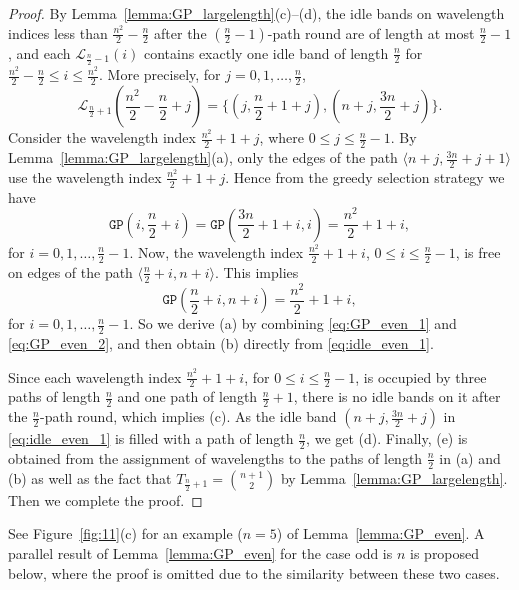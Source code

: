 \documentclass[journal,draftcls,onecolumn,12pt,twoside]{IEEEtran}
\newcommand{\GP}{{\mathtt{GP}}}
\begin{document}
\begin{proof}
By Lemma~\ref{lemma:GP_largelength}(c)--(d), the idle bands on wavelength indices less than $\frac{n^2}{2}-\frac{n}{2}$ after the $(\frac{n}{2}-1)$-path round are of length at most $\frac{n}{2}-1$, and each $\mathcal{L}_{\frac{n}{2}-1}(i)$ contains exactly one idle band of length $\frac{n}{2}$ for $\frac{n^2}{2}-\frac{n}{2}\leq i\leq \frac{n^2}{2}$.
More precisely, for $j=0,1,\ldots,\frac{n}{2}$,
\begin{equation}\label{eq:idle_even_1}
\mathcal{L}_{\frac{n}{2}+1}(\frac{n^2}{2}-\frac{n}{2}+j)=\Big\{(j,\frac{n}{2}+1+j),(n+j,\frac{3n}{2}+j)\Big\}.
\end{equation}
Consider the wavelength index $\frac{n^2}{2}+1+j$, where $0\leq j\leq\frac{n}{2}-1$.
By Lemma~\ref{lemma:GP_largelength}(a), only the edges of the path $\langle n+j,\frac{3n}{2}+j+1\rangle$ use the wavelength index $\frac{n^2}{2}+1+j$.
Hence from the greedy selection strategy we have 
\begin{equation}\label{eq:GP_even_1}
\GP(i,\frac{n}{2}+i)=\GP(\frac{3n}{2}+1+i,i)=\frac{n^2}{2}+1+i,
\end{equation}
for $i=0,1,\ldots,\frac{n}{2}-1$.
Now, the wavelength index $\frac{n^2}{2}+1+i$, $0\leq i\leq\frac{n}{2}-1$, is free on edges of the path $\langle\frac{n}{2}+i,n+i\rangle$.
This implies
\begin{equation}\label{eq:GP_even_2}
\GP(\frac{n}{2}+i,n+i)=\frac{n^2}{2}+1+i,
\end{equation}
for $i=0,1,\ldots,\frac{n}{2}-1$.
So we derive (a) by combining \eqref{eq:GP_even_1} and \eqref{eq:GP_even_2}, and then obtain (b) directly from \eqref{eq:idle_even_1}.

Since each wavelength index $\frac{n^2}{2}+1+i$, for $0\leq i\leq \frac{n}{2}-1$, is occupied by three paths of length $\frac{n}{2}$ and one path of length $\frac{n}{2}+1$, there is no idle bands on it after the $\frac{n}{2}$-path round, which implies (c).
As the idle band $(n+j,\frac{3n}{2}+j)$ in \eqref{eq:idle_even_1} is filled with a path of length $\frac{n}{2}$, we get (d).
Finally, (e) is obtained from the assignment of wavelengths to the paths of length $\frac{n}{2}$ in (a) and (b) as well as the fact that $T_{\frac{n}{2}+1}={n+1\choose 2}$ by Lemma~\ref{lemma:GP_largelength}.
Then we complete the proof.
\end{proof}	

See Figure~\ref{fig:11}(c) for an example ($n=5$) of Lemma~\ref{lemma:GP_even}.
A parallel result of Lemma~\ref{lemma:GP_even} for the case odd is $n$ is proposed below, where the proof is omitted due to the similarity between these two cases.
\end{document}
